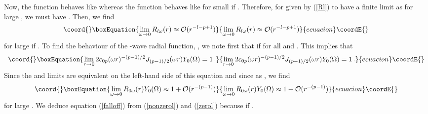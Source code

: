 \documentclass[a4paper,12pt]{article}
\begin{document}
Now, the function \coordHE{} behaves like \coordHE{}
whereas the function \coordHE{} behaves like \coordHE{} for small \coordHE{} 
if \coordHE{}.  
Therefore, for \coordHE{} given by (\ref{Rl}) to have
a finite limit as \coordHE{} for large \coordHE{}, we must have 
\coordHE{}.
Then, we find
\begin{equation}\coord{}\boxEquation{
\lim_{\omega \to 0}R_{l\omega}(r) \approx {\cal O}(r^{-l-p+1}) \label{nonzerol}
}{
\lim_{\omega \to 0}R_{l\omega}(r) \approx {\cal O}(r^{-l-p+1}) }{ecuacion}\coordE{}\end{equation}
 for large \coordHE{} if \coordHE{}.
To find the behaviour of the \coordHE{}-wave radial function,
\coordHE{}, we note first that 
\coordHE{} if
\coordHE{} for all \coordHE{} and \myHighlight{$\omega$}\coordHE{}.  This implies that
\begin{equation}\coord{}\boxEquation{
\lim_{r\to 0}2c_{0p} (\omega r)^{-(p-1)/2}J_{(p-1)/2}(\omega r)Y_0(\Omega)
= 1\,.
}{
\lim_{r\to 0}2c_{0p} (\omega r)^{-(p-1)/2}J_{(p-1)/2}(\omega r)Y_0(\Omega)
= 1\,.
}{ecuacion}\coordE{}\end{equation}
Since the \coordHE{} and \coordHE{} limits are equivalent on the 
left-hand side of this equation and since 
\coordHE{} as \coordHE{}, 
we find
\begin{equation}\coord{}\boxEquation{
\lim_{\omega\to 0}R_{0\omega}(r)Y_0(\Omega) \approx 
1 + {\cal O}(r^{-(p-1)}) \label{zerol}
}{
\lim_{\omega\to 0}R_{0\omega}(r)Y_0(\Omega) \approx 
1 + {\cal O}(r^{-(p-1)}) }{ecuacion}\coordE{}\end{equation} 
for large \coordHE{}.
We deduce equation (\ref{falloff}) from (\ref{nonzerol}) and (\ref{zerol})
because \coordHE{} if \coordHE{}.
\end{document}
